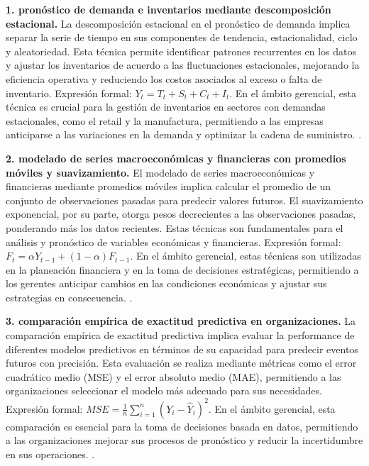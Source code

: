 {\textbf{1. pronóstico de demanda e inventarios mediante descomposición estacional.} La descomposición estacional en el pronóstico de demanda implica separar la serie de tiempo en sus componentes de tendencia, estacionalidad, ciclo y aleatoriedad. Esta técnica permite identificar patrones recurrentes en los datos y ajustar los inventarios de acuerdo a las fluctuaciones estacionales, mejorando la eficiencia operativa y reduciendo los costos asociados al exceso o falta de inventario. Expresión formal: $Y_t = T_t + S_t + C_t + I_t$. En el ámbito gerencial, esta técnica es crucial para la gestión de inventarios en sectores con demandas estacionales, como el retail y la manufactura, permitiendo a las empresas anticiparse a las variaciones en la demanda y optimizar la cadena de suministro. \citep{anderson2012,lind2012,wackerly2010}.

\textbf{2. modelado de series macroeconómicas y financieras con promedios móviles y suavizamiento.} El modelado de series macroeconómicas y financieras mediante promedios móviles implica calcular el promedio de un conjunto de observaciones pasadas para predecir valores futuros. El suavizamiento exponencial, por su parte, otorga pesos decrecientes a las observaciones pasadas, ponderando más los datos recientes. Estas técnicas son fundamentales para el análisis y pronóstico de variables económicas y financieras. Expresión formal: $F_t = \alpha Y_{t-1} + (1-\alpha) F_{t-1}$. En el ámbito gerencial, estas técnicas son utilizadas en la planeación financiera y en la toma de decisiones estratégicas, permitiendo a los gerentes anticipar cambios en las condiciones económicas y ajustar sus estrategias en consecuencia. \citep{anderson2012,lind2012,wackerly2010}.

\textbf{3. comparación empírica de exactitud predictiva en organizaciones.} La comparación empírica de exactitud predictiva implica evaluar la performance de diferentes modelos predictivos en términos de su capacidad para predecir eventos futuros con precisión. Esta evaluación se realiza mediante métricas como el error cuadrático medio (MSE) y el error absoluto medio (MAE), permitiendo a las organizaciones seleccionar el modelo más adecuado para sus necesidades. Expresión formal: $MSE = \frac{1}{n} \sum_{i=1}^{n} (Y_i - \hat{Y}_i)^2$. En el ámbito gerencial, esta comparación es esencial para la toma de decisiones basada en datos, permitiendo a las organizaciones mejorar sus procesos de pronóstico y reducir la incertidumbre en sus operaciones. \citep{anderson2012,lind2012,wackerly2010}.

}
